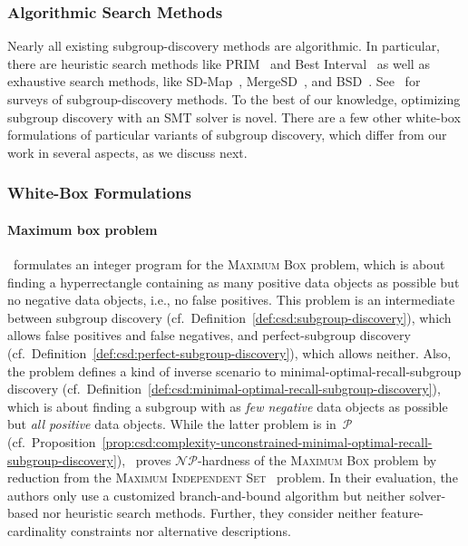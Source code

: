 \documentclass{article}
\theoremstyle{definition}
\begin{document}
\subsubsection{Algorithmic Search Methods}
\label{sec:csd:related-work:subgroup-discovery:algorithmic-methods}

Nearly all existing subgroup-discovery methods are algorithmic.
In particular, there are heuristic search methods like PRIM~\cite{friedman1999bump} and Best Interval~\cite{mampaey2012efficient} as well as exhaustive search methods, like SD-Map~\cite{atzmueller2009fast, atzmueller2006sd}, MergeSD~\cite{grosskreutz2009subgroup}, and BSD~\cite{lemmerich2016fast, lemmerich2010fast}.
See~\cite{atzmueller2015subgroup, helal2016subgroup, herrera2011overview, ventura2018subgroup} for surveys of subgroup-discovery methods.
To the best of our knowledge, optimizing subgroup discovery with an SMT solver is novel.
There are a few other white-box formulations of particular variants of subgroup discovery, which differ from our work in several aspects, as we discuss next.

\subsubsection{White-Box Formulations}
\label{sec:csd:related-work:subgroup-discovery:white-box}

\paragraph{Maximum box problem}

\cite{eckstein2002maximum}~formulates an integer program for the \textsc{Maximum Box} problem, which is about finding a hyperrectangle containing as many positive data objects as possible but no negative data objects, i.e., no false positives.
This problem is an intermediate between subgroup discovery (cf.~Definition~\ref{def:csd:subgroup-discovery}), which allows false positives and false negatives, and perfect-subgroup discovery (cf.~Definition~\ref{def:csd:perfect-subgroup-discovery}), which allows neither.
Also, the problem defines a kind of inverse scenario to minimal-optimal-recall-subgroup discovery (cf.~Definition~\ref{def:csd:minimal-optimal-recall-subgroup-discovery}), which is about finding a subgroup with as \emph{few negative} data objects as possible but \emph{all positive} data objects.
While the latter problem is in~$\mathcal{P}$ (cf.~Proposition~\ref{prop:csd:complexity-unconstrained-minimal-optimal-recall-subgroup-discovery}), \cite{eckstein2002maximum}~proves $\mathcal{NP}$-hardness of the \textsc{Maximum Box} problem by reduction from the \textsc{Maximum Independent Set}~\cite{tarjan1977finding} problem.
In their evaluation, the authors only use a customized branch-and-bound algorithm but neither solver-based nor heuristic search methods.
Further, they consider neither feature-cardinality constraints nor alternative descriptions.
\end{document}
